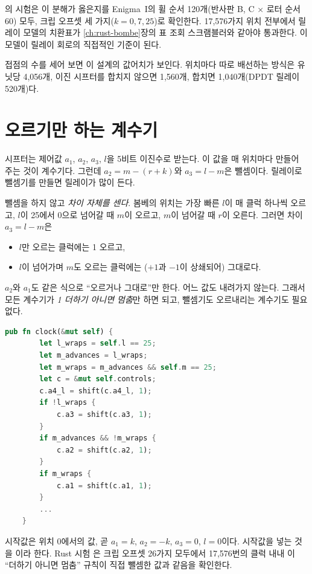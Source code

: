 의 시험은 이 분해가 옳은지를 Enigma~I의 휠 순서 120개(반사판 B, C × 로터 순서 60) 모두, 크립
오프셋 세 가지($k = 0, 7, 25$)로 확인한다. 17,576가지 위치 전부에서 릴레이 모델의 치환표가 \ref{ch:rust-bombe}장의
표 조회 스크램블러와 같아야 통과한다. 이 모델이 릴레이 회로의 직접적인 기준이 된다.

접점의 수를 세어 보면 이 설계의 값어치가 보인다. 위치마다 따로 배선하는 방식은 유닛당 4,056개, 이진
시프터를 합치지 않으면 1,560개, 합치면 1,040개(DPDT 릴레이 520개)다.

\section{오르기만 하는 계수기}\label{sec:relay-counter}

시프터는 제어값 $a_1$, $a_2$, $a_3$, $l$을 5비트 이진수로 받는다. 이 값을 매 위치마다 만들어 주는 것이
계수기다. 그런데 $a_2 = m - (r+k)$와 $a_3 = l - m$은 뺄셈이다. 릴레이로 뺄셈기를 만들면 릴레이가 많이 든다.

\Why 뺄셈을 하지 않고 \emph{차이 자체를 센다}. 봄베의 위치는 가장 빠른 $l$이 매 클럭 하나씩 오르고,
$l$이 25에서 0으로 넘어갈 때 $m$이 오르고, $m$이 넘어갈 때 $r$이 오른다. 그러면 차이 $a_3 = l - m$은
\begin{itemize}
\item $l$만 오르는 클럭에는 1 오르고,
\item $l$이 넘어가며 $m$도 오르는 클럭에는 ($+1$과 $-1$이 상쇄되어) 그대로다.
\end{itemize}
$a_2$와 $a_1$도 같은 식으로 ``오르거나 그대로''만 한다. 어느 값도 내려가지 않는다. 그래서 모든 계수기가
\emph{1 더하기 아니면 멈춤}만 하면 되고, 뺄셈기도 오르내리는 계수기도 필요 없다.

\begin{lstlisting}[language=Rust,caption={\code{relay.rs}: 한 클럭. 더하기(mod 26)와 멈춤만 쓴다.},label={lst:r-counters}]
    pub fn clock(&mut self) {
        let l_wraps = self.l == 25;
        let m_advances = l_wraps;
        let m_wraps = m_advances && self.m == 25;
        let c = &mut self.controls;
        c.a4_l = shift(c.a4_l, 1);
        if !l_wraps {
            c.a3 = shift(c.a3, 1);
        }
        if m_advances && !m_wraps {
            c.a2 = shift(c.a2, 1);
        }
        if m_wraps {
            c.a1 = shift(c.a1, 1);
        }
        ...
    }
\end{lstlisting}

시작값은 위치 0에서의 값, 곧 $a_1 = k$, $a_2 = -k$, $a_3 = 0$, $l = 0$이다. 시작값을 넣는 것을 이라
한다. Rust 시험 은 크립 오프셋 26가지 모두에서 17,576번의
클럭 내내 이 ``더하기 아니면 멈춤'' 규칙이 직접 뺄셈한 값과 같음을 확인한다.

